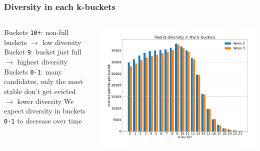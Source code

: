 \documentclass{pl-slide}
\begin{document}
\begin{frame}
\frametitle{Diversity in each k-buckets}

\begin{columns}[onlytextwidth]
\begin{column}{0.38\textwidth}
   \begin{itemize}
   		\itemc Buckets \texttt{10+}: non-full buckets $\rightarrow$ low diversity
   		\itemc Bucket \texttt{9}: bucket just full \\$\rightarrow$ highest diversity
   		\itemc Buckets \texttt{0-1}: many candidates, only the most stable don't get evicted \\$\rightarrow$ lower diversity
   		\itemc We expect diversity in buckets \texttt{0-1} to decrease over time
   \end{itemize}
\end{column}
\begin{column}{0.58\textwidth}
    \begin{center}
		\includegraphics[width=\textwidth]{plots/diversity-in-buckets.png}
    \end{center}
\end{column}
\end{columns}
\end{frame}
\end{document}
